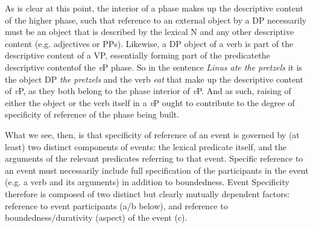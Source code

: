 \documentclass[output=paper
,modfonts
,nonflat
]{langsci/langscibook}
\begin{document}

As is clear at this point, the interior of a phase makes up the descriptive content of the higher phase, such that reference to an external object by a DP necessarily must be an object that is described by the lexical N and any other descriptive content (e.g. adjectives or PPs). Likewise, a DP object of a verb is part of the descriptive content of a VP, essentially forming part of the predicate\textemdash the descriptive content\textemdash of the \textit{v}P phase. So in the sentence \textit{Linus ate the pretzels} it is the object DP \textit{the pretzels} and the verb \textit{eat} that make up the descriptive content of \textit{v}P, as they both belong to the phase interior of \textit{v}P. And as such, raising of either the object or the verb itself in a \textit{v}P ought to contribute to the degree of specificity of reference of the phase being built.%

What we see, then, is that specificity of reference of an event is governed by (at least) two distinct components of events: the lexical predicate itself, and the arguments of the relevant predicates referring to that event. Specific reference to an event must necessarily include full specification of the participants in the event (e.g. a verb and its arguments) in addition to boundedness. Event Specificity therefore is composed of two distinct but clearly mutually dependent factors: reference to event participants (a/b below), and reference to boundedness/durativity (aspect) of the event (c). 
\end{document}
